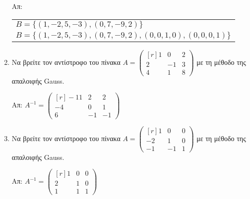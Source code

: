 \begin{enumerate}
    \hfill Απ:  \begin{tabular}{l}
      $B = \{ (1,-2,5,-3), (0,7,-9,2) \}$ \\
      $ B = \{ (1,-2,5,-3), (0,7,-9,2), (0,0,1,0), (0,0,0,1) \} $
    \end{tabular} 

  \item Να βρείτε τον αντίστροφο του πίνακα $ A = 
    \begin{pmatrix*}[r]
      1 & 0 & 2 \\
      2 & -1 & 3 \\
      4 & 1 & 8
    \end{pmatrix*}$ με τη μέθοδο της απαλοιφής Gauss.

    \hfill Απ: $ A^{-1} = 
    \begin{pmatrix*}[r]
      -11 & 2 & 2 \\
      -4 & 0 & 1 \\
      6 & -1 & -1
    \end{pmatrix*} $ 

  \item Να βρείτε τον αντίστροφο του πίνακα $ A = 
    \begin{pmatrix*}[r]
      1 & 0 & 0 \\
      -2 & 1 & 0 \\
      -1 & -1 & 1
    \end{pmatrix*}$ με τη μέθοδο της απαλοιφής Gauss.

    \hfill Απ: $ A^{-1} = 
    \begin{pmatrix*}[r]
      1 & 0 & 0 \\
      2 & 1 & 0 \\
      1 & 1 & 1
    \end{pmatrix*}$
\end{enumerate}



